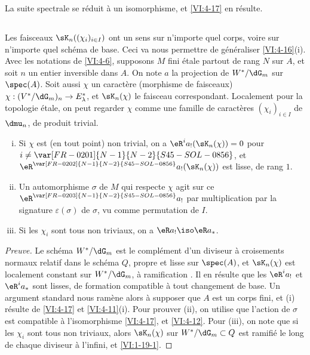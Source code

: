La suite spectrale se réduit à un isomorphisme, et \ref{VI:4-17} en 
résulte. 





\subsection{}\label{VI:4-19}

Les faisceaux $\sK_n((\chi_i)_{i\in I})$ ont un sens sur n'importe quel corps, 
voire sur n'importe quel schéma de base. Ceci va nous permettre de généraliser 
\ref{VI:4-16}(i). Avec les notations de \ref{VI:4-6}, supposons $M$ fini 
étale partout de rang $N$ sur $A$, et soit $n$ un entier inversible dans $A$. 
On note $a$ la projection de $W^\ast/\dG_m$ sur $\spec(A)$. Soit aussi $\chi$ 
un caractère (morphisme de faisceaux) 
$\chi:(V^\ast/\dG_m)_n \to E_\lambda^\ast$, et $\sK_n(\chi)$ le faisceau 
correspondant. Localement pour la topologie étale, on peut regarder $\chi$ 
comme une famille de caractères $(\chi_i)_{i\in I}$ de $\dmu_n$, de produit 
trivial. 





\begin{proposition_}\label{VI:4-20}
\begin{enumerate}[(i)]
  \item Si $\chi$ est (en tout point) non trivial, on a 
    $\eR^i a_! (\sK_n(\chi)) = 0$ pour $i\ne \var[FR-0201]{N-1}{N-2}{S45-SOL-0856}$, et 
    $\eR^{\var[FR-0202]{N-1}{N-2}{S45-SOL-0856}} a_!(\sK_n(\chi))$ est lisse, de rang $1$. 
  \item Un automorphisme $\sigma$ de $M$ qui respecte $\chi$ agit sur ce 
    $\eR^{\var[FR-0203]{N-1}{N-2}{S45-SOL-0856}} a_!$ par multiplication par la signature $\varepsilon(\sigma)$ 
    de $\sigma$, vu comme permutation de $I$. 
  \item Si les $\chi_i$ sont tous non triviaux, on a $\eR a_! \iso \eR a_\ast$. 
\end{enumerate}
\end{proposition_}
\begin{proof}[Preuve]
Le schéma $W^\ast/\dG_m$ est le complément d'un diviseur à croisements 
normaux relatif dans le schéma $Q$, propre et lisse sur $\spec(A)$, et 
$\sK_n(\chi)$ est 
localement constant sur $W^\ast/\dG_m$, à ramification 
. Il en résulte que les $\eR^i a_!$ et 
$\eR^i a_\ast$ sont lisses, de formation compatible à tout changement de 
base. Un argument standard nous ramène alors à supposer que $A$ est un 
corps fini, et (i) résulte de \ref{VI:4-17} et \ref{VI:4-11}(i). Pour 
prouver (ii), on utilise que l'action de $\sigma$ est compatible à 
l'isomorphisme \ref{VI:4-17}, et \ref{VI:4-12}. Pour (iii), on note que si les 
$\chi_i$ sont tous non triviaux, alors $\sK_n(\chi)$ sur 
$W^\ast/\dG_m\subset Q$ est ramifié le long de chaque diviseur à l'infini, 
et \ref{VI:1-19-1}. 
\end{proof}











